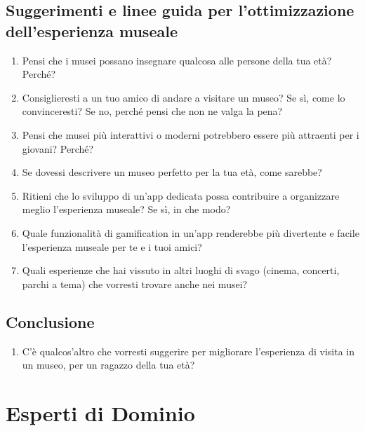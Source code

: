 \documentclass[a4paper, 12pt]{article}
\begin{document}
\subsection{\textcolor{subsectioncolor}{Suggerimenti e linee guida per l'ottimizzazione \\ dell'esperienza museale}}
\begin{enumerate}[label=\textcolor{textcolor}{\arabic*.}]
    \item \textcolor{textcolor}{Pensi che i musei possano insegnare qualcosa alle persone della tua età? Perché?}
    \item \textcolor{textcolor}{Consiglieresti a un tuo amico di andare a visitare un museo? Se sì, come lo convinceresti? Se no, perché pensi che non ne valga la pena?}
    \item \textcolor{textcolor}{Pensi che musei più interattivi o moderni potrebbero essere più attraenti per i giovani? Perché?}
    \item \textcolor{textcolor}{Se dovessi descrivere un museo perfetto per la tua età, come sarebbe?}
    \item \textcolor{textcolor}{Ritieni che lo sviluppo di un'app dedicata possa contribuire a organizzare meglio l'esperienza museale? Se sì, in che modo?}
    \item \textcolor{textcolor}{Quale funzionalità di gamification in un’app renderebbe più divertente e facile l’esperienza museale per te e i tuoi amici?}
    \item \textcolor{textcolor}{Quali esperienze che hai vissuto in altri luoghi di svago (cinema, concerti, parchi a tema) che vorresti trovare anche nei musei?}
\end{enumerate}

\subsection{\textcolor{subsectioncolor}{Conclusione}}
\begin{enumerate}
    \item C'è qualcos'altro che vorresti suggerire per migliorare l'esperienza di visita in un museo, per un ragazzo della tua età?
\end{enumerate}

\newpage

\section{\textcolor{sectioncolor}{Esperti di Dominio}}
\end{document}
